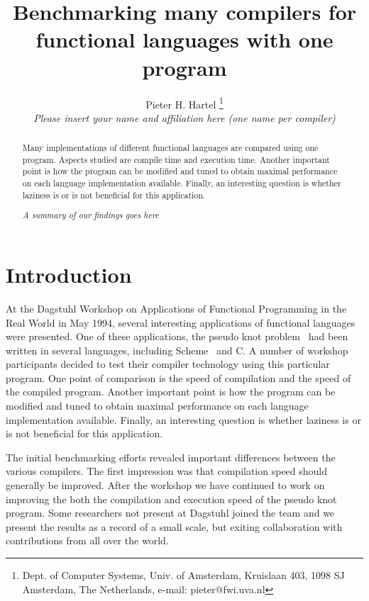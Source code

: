 
\textheight 240mm
\addtolength{\topmargin}{-25mm}
\addtolength{\oddsidemargin}{-18mm}
\addtolength{\evensidemargin}{-18mm}
\addtolength{\footheight}{10mm}
\textwidth 160mm



\title{Benchmarking many compilers for functional languages with one program}


\author{
Pieter H. Hartel \thanks{Dept. of Computer Systems, Univ. of Amsterdam,
Kruislaan 403, 1098 SJ Amsterdam, The Netherlands, e-mail: pieter@fwi.uva.nl} \\
{\em Please insert your name and affiliation here (one name per compiler)}
}

\maketitle
\sloppy
\begin{abstract}
Many implementations of different functional languages are compared
using one program. Aspects studied are compile time and execution
time. Another important point is how the program can be modified and
tuned to obtain maximal performance on each language implementation
available. Finally, an interesting question is whether laziness is or
is not beneficial for this application.

{\em A summary of our findings goes here}
\end{abstract}


\section{Introduction}
\label{sec:intro}
At the Dagstuhl Workshop on Applications of Functional Programming in
the Real World in May 1994, several interesting applications of
functional languages were presented. One of these applications, the
pseudo knot problem~\cite{Fee94} had been written in several languages,
including Scheme~\cite{???} and C. A number of workshop participants
decided to test their compiler technology using this particular
program. One point of comparison is the speed of compilation and the
speed of the compiled program. Another important point is how the
program can be modified and tuned to obtain maximal performance on each
language implementation available. Finally, an interesting question is
whether laziness is or is not beneficial for this application.

The initial benchmarking efforts revealed important differences between
the various compilers. The first impression was that compilation speed
should generally be improved. After the workshop we have continued to
work on improving the both the compilation and execution speed of the
pseudo knot program. Some researchers not present at Dagstuhl joined
the team and we present the results as a record of a small scale, but
exiting collaboration with contributions from all over the world.

